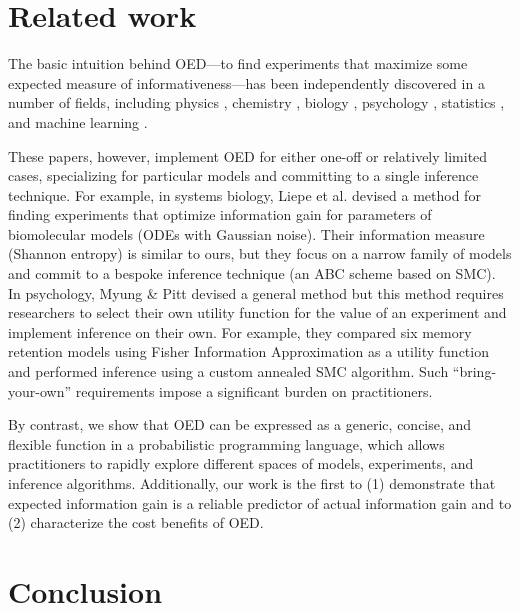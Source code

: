 \documentclass{article}
\begin{document}

\section{Related work}

The basic intuition behind OED---to find experiments that maximize some expected measure of informativeness---has been independently discovered in a number of fields, including physics \cite{vanDenBerg2003}, chemistry \cite{Huan2010}, biology \cite{Vanlier2012, Liepe2013}, psychology \cite{Myung2009}, statistics \cite{Lindley1956}, and machine learning \cite{Golovin2010}.

These papers, however, implement OED for either one-off or relatively limited cases, specializing for  particular models and committing to a single inference technique.
For example, in systems biology, Liepe et al. \cite{Liepe2013} devised a method for finding experiments that optimize information gain for parameters of biomolecular models (ODEs with Gaussian noise).
Their information measure (Shannon entropy) is similar to ours, but they focus on a narrow family of models and commit to a bespoke inference technique (an ABC scheme based on SMC).
In psychology, Myung \& Pitt \cite{Myung2009} devised a general method but this method requires researchers to select their own utility function for the value of an experiment and implement inference on their own.
For example, they compared six memory retention models using Fisher Information Approximation as a utility function and performed inference using a custom annealed SMC algorithm.
Such ``bring-your-own'' requirements impose a significant burden on practitioners.

By contrast, we show that OED can be expressed as a generic, concise, and flexible function in a probabilistic programming language, which allows practitioners to rapidly explore different spaces of models, experiments, and inference algorithms.
Additionally, our work is the first to (1) demonstrate that expected information gain is a reliable predictor of actual information gain and to (2) characterize the cost benefits of OED.

\section{Conclusion}
\end{document}
